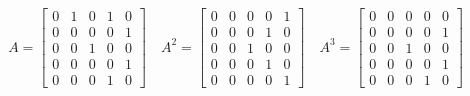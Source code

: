 \[
  A =
  \begin{bmatrix}
    0 & 1 & 0 & 1 & 0 \\
    0 & 0 & 0 & 0 & 1 \\
    0 & 0 & 1 & 0 & 0 \\
    0 & 0 & 0 & 0 & 1 \\
    0 & 0 & 0 & 1 & 0
  \end{bmatrix}
  \quad
  A^2 =
  \begin{bmatrix}
    0 & 0 & 0 & 0 & 1 \\
    0 & 0 & 0 & 1 & 0 \\
    0 & 0 & 1 & 0 & 0 \\
    0 & 0 & 0 & 1 & 0 \\
    0 & 0 & 0 & 0 & 1
  \end{bmatrix}
  \quad
  A^3 =
  \begin{bmatrix}
    0 & 0 & 0 & 0 & 0 \\
    0 & 0 & 0 & 0 & 1 \\
    0 & 0 & 1 & 0 & 0 \\
    0 & 0 & 0 & 0 & 1 \\
    0 & 0 & 0 & 1 & 0
  \end{bmatrix}
\]

